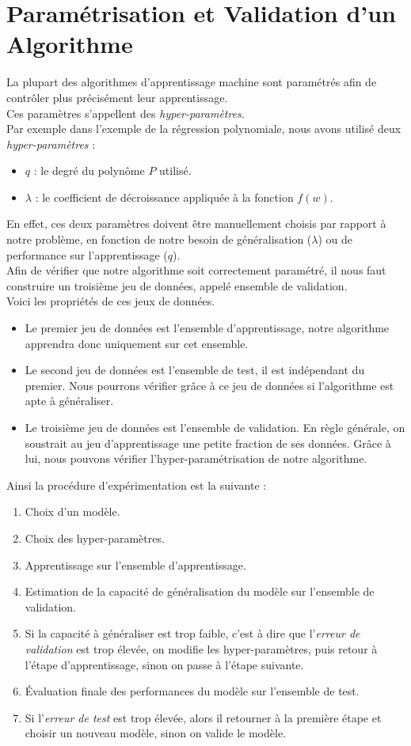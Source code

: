 \documentclass[10pt,a4paper]{report}
\begin{document}
	\section{Paramétrisation et Validation d'un Algorithme}
	La plupart des algorithmes d'apprentissage machine sont paramétrés afin de contrôler plus précisément leur apprentissage.\\
	Ces paramètres s'appellent des \emph{hyper-paramètres}.\\
	Par exemple dans l'exemple de la régression polynomiale, nous avons utilisé deux \emph{hyper-paramètres} :
	\begin{itemize}
		\item $q$ : le degré du polynôme $P$ utilisé.
		\item $\lambda$ : le coefficient de décroissance appliquée à la fonction $f(w)$.
	\end{itemize}
	En effet, ces deux paramètres doivent être manuellement choisis par rapport à notre problème, en fonction de notre besoin de généralisation ($\lambda$) ou de performance sur l'apprentissage ($q$).\\
	Afin de vérifier que notre algorithme soit correctement paramétré, il nous faut construire un troisième jeu de données, appelé ensemble de validation.\\
	Voici les propriétés de ces jeux de données.
	\begin{itemize}
		\item Le premier jeu de données est l'ensemble d'apprentissage, notre algorithme apprendra donc uniquement sur cet ensemble.
		\item Le second jeu de données est l'ensemble de test, il est indépendant du premier. Nous pourrons vérifier grâce à ce jeu de données si l'algorithme est apte à généraliser.
		\item Le troisième jeu de données est l'ensemble de validation. En règle générale, on soustrait au jeu d'apprentissage une petite fraction de ses données. Grâce à lui, nous pouvons vérifier l'hyper-paramétrisation de notre algorithme.
	\end{itemize}
	Ainsi la procédure d'expérimentation est la suivante :
	\begin{enumerate}
		\item Choix d'un modèle.
		\item Choix des hyper-paramètres.
		\item Apprentissage sur l'ensemble d'apprentissage.
		\item Estimation de la capacité de généralisation du modèle sur l'ensemble de validation.
		\item Si la capacité à généraliser est trop faible, c'est à dire que l'\emph{erreur de validation} est trop élevée, on modifie les hyper-paramètres, puis retour à l'étape d'apprentissage, sinon on passe à l'étape suivante.
		\item Évaluation finale des performances du modèle sur l'ensemble de test.
		\item Si l'\emph{erreur de test} est trop élevée, alors il retourner à la première étape et choisir un nouveau modèle, sinon on valide le modèle.
	\end{enumerate}
	
\end{document}
